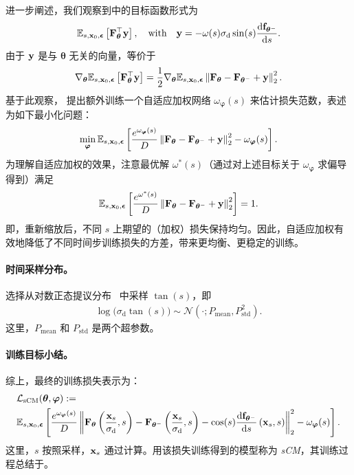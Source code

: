 进一步阐述，我们观察到中的目标函数形式为 
\[
\mathbb{E}_{s, {\mathbf{x}}_0, \bm{\epsilon}} \left[{\mathbf{F}}_{\bm{\theta}}^\top {\mathbf{y}} \right],\quad\text{with}\quad {\mathbf{y}}=-\omega(s) \sigma_{\mathrm{d}} \sin(s)\frac{\mathop{}\!\mathrm{d} {\mathbf{f}}_{\bm{\theta}^-}}{\mathop{}\!\mathrm{d} s}.
\]
由于 ${\mathbf{y}}$ 是与 $\bm{\theta}$ 无关的向量，等价于
\begin{align*}
    \nabla_{\bm{\theta}} \mathbb{E}_{s, {\mathbf{x}}_0, \bm{\epsilon}} \left[{\mathbf{F}}_{\bm{\theta}}^\top {\mathbf{y}} \right]
    = \frac{1}{2} \nabla_{\bm{\theta}} \mathbb{E}_{s, {\mathbf{x}}_0, \bm{\epsilon}} \left\| {\mathbf{F}}_{\bm{\theta}} - {\mathbf{F}}_{\bm{\theta}^-} + {\mathbf{y}} \right\|_2^2.
\end{align*}
基于此观察，\citet{lu2024simplifying} 提出额外训练一个自适应加权网络 $\omega_{\bm{\varphi}}(s)$ 来估计损失范数，表述为如下最小化问题：
\begin{align*}
    \min_{\bm{\varphi}} \mathbb{E}_{s, {\mathbf{x}}_0, \bm{\epsilon}} \left[ \frac{e^{\omega_{\bm{\varphi}}(s)}}{D} \left\| {\mathbf{F}}_{\bm{\theta}} - {\mathbf{F}}_{\bm{\theta}^-} + {\mathbf{y}} \right\|_2^2 - \omega_{\bm{\varphi}}(s) \right].
\end{align*}
为理解自适应加权的效果，注意最优解 $\omega^*(s)$（通过对上述目标关于 $\omega_{\bm{\varphi}}$ 求偏导得到）满足
\begin{align}\label{eq:effect-adaptive-wgt}
    \mathbb{E}_{s, {\mathbf{x}}_0, \bm{\epsilon}} \left[ \frac{e^{\omega^*(s)}}{D} \left\| {\mathbf{F}}_{\bm{\theta}} - {\mathbf{F}}_{\bm{\theta}^-} + {\mathbf{y}} \right\|_2^2 \right] = 1.
\end{align}
即，重新缩放后，不同 $s$ 上期望的（加权）损失保持均匀。因此，自适应加权有效地降低了不同时间步训练损失的方差，带来更均衡、更稳定的训练。

\paragraph{时间采样分布。} \citet{lu2024simplifying} 选择从对数正态提议分布~\citep{karras2022elucidating} 中采样 $\tan(s)$，即
\begin{align}\label{eq:s-dist}
    \log\big(\sigma_{\mathrm{d}} \tan(s)\big) \sim \mathcal{N}(\cdot;P_{\text{mean}}, P_{\text{std}}^2).
\end{align}
这里，$P_{\text{mean}}$ 和 $P_{\text{std}}$ 是两个超参数。


\paragraph{训练目标小结。} 综上，最终的训练损失表示为：
\begin{align*}
    &\mathcal{L}_{\text{sCM}}(\bm{\theta}, \bm{\varphi})
    := \\&\mathbb{E}_{s, {\mathbf{x}}_0, \bm{\epsilon}} \left[
    \frac{e^{\omega_{\bm{\varphi}}(s)}}{D}
    \left\|
    {\mathbf{F}}_{\bm{\theta}}\left(\frac{{\mathbf{x}}_s}{\sigma_{\mathrm{d}}}, s\right)
    - {\mathbf{F}}_{\bm{\theta}^-}\left(\frac{{\mathbf{x}}_s}{\sigma_{\mathrm{d}}}, s\right)
    - \cos(s) \frac{\mathop{}\!\mathrm{d} {\mathbf{f}}_{\bm{\theta}^-}}{\mathop{}\!\mathrm{d} s}\left({\mathbf{x}}_s, s\right)
    \right\|_2^2
    - \omega_{\bm{\varphi}}(s)
    \right].
\end{align*}
这里，$s$ 按照采样，${\mathbf{x}}_s$ 通过计算。用该损失训练得到的模型称为 \emph{sCM}，其训练过程总结于。


